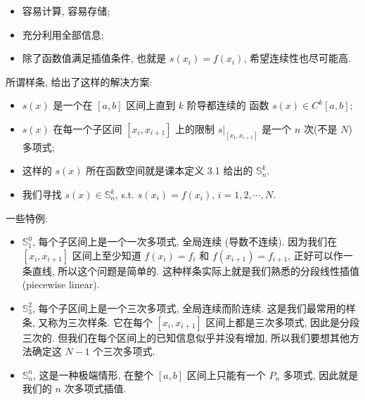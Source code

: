 \documentclass[a4paper]{ctexart}
\begin{document}
\begin{itemize}
\item 容易计算, 容易存储;
\item 充分利用全部信息;
\item 除了函数值满足插值条件, 也就是 $s(x_i) = f(x_i)$, 希望连续性也尽可能高. 
\end{itemize}

所谓样条, 给出了这样的解决方案:

\begin{itemize}
\item $s(x)$ 是一个在 $[a, b]$ 区间上直到 $k$ 阶导都连续的
  函数 $s(x) \in C^k[a, b]$;
\item $s(x)$ 在每一个子区间 $[x_i, x_{i + 1}]$ 上的限制
  $\left.s\right|_{[x_i, x_{i + 1}]}$ 是一个 $n$ 次(不是 $N$)多项式;
\item 这样的 $s(x)$ 所在函数空间就是课本定义 3.1 给出的 $\mathbb{S}_n^k$.
\item 我们寻找 $s(x) \in \mathbb{S}_n^k$, s.t. $s(x_i) = f(x_i)$, $i =
  1, 2, \cdots, N$.
\end{itemize}

一些特例:

\begin{itemize}
  \item $\mathbb{S}_1^0$, 每个子区间上是一个一次多项式, 全局连续 (导数不连续). 
  因为我们在 $[x_i, x_{i + 1}]$ 区间上至少知道 $f(x_i) = f_i$ 和 
  $f(x_{i + 1}) = f_{i + 1}$, 正好可以作一条直线, 所以这个问题是简单的. 
  这种样条实际上就是我们熟悉的分段线性插值 (piecewise linear). 
  \item $\mathbb{S}_3^2$, 每个子区间上是一个三次多项式, 全局连续而阶连续. 
  这是我们最常用的样条, 又称为三次样条. 它在每个 $[x_i, x_{i + 1}]$ 
  区间上都是三次多项式, 因此是分段三次的. 但我们在每个区间上的已知信息似乎并没有增加, 
  所以我们要想其他方法确定这 $N - 1$ 个三次多项式. 
  \item $\mathbb{S}_n^n$, 这是一种极端情形, 在整个 $[a, b]$ 区间上只能有一个 
  $P_n$ 多项式, 因此就是我们的 $n$ 次多项式插值.    
\end{itemize}


\end{document}
